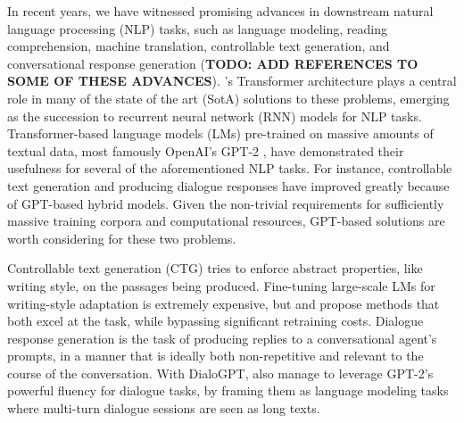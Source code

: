 

 

In recent years, we have witnessed promising advances in downstream natural language processing (NLP) tasks, such as language modeling, reading comprehension, machine translation, controllable text generation, and conversational response generation (\textbf{TODO: ADD REFERENCES TO SOME OF THESE ADVANCES}). \citeauthor{vaswani2017attention}'s Transformer architecture plays a central role in many of the state of the art (SotA) solutions to these problems, emerging as the succession to recurrent neural network (RNN) models for NLP tasks. Transformer-based language models (LMs) pre-trained on massive amounts of textual data, most famously OpenAI's GPT-2 \citep{radford2019language}, have demonstrated their usefulness for several of the aforementioned NLP tasks. For instance, controllable text generation and producing dialogue responses have improved greatly because of GPT-based hybrid models. Given the non-trivial requirements for sufficiently massive training corpora and computational resources, GPT-based solutions are worth considering for these two problems.

Controllable text generation (CTG) tries to enforce abstract properties, like writing style, on the passages being produced. Fine-tuning large-scale LMs for writing-style adaptation is extremely expensive, but \cite{dathathri2019plug} and \cite{li-etal-2020-optimus} propose methods that both excel at the task, while bypassing significant retraining costs. Dialogue response generation is the task of producing replies to a conversational agent's prompts, in a manner that is ideally both non-repetitive and relevant to the course of the conversation. With DialoGPT, \cite{zhang2019dialogpt} also manage to leverage GPT-2's powerful fluency for dialogue tasks, by framing them as language modeling tasks where multi-turn dialogue sessions are seen as long texts.

